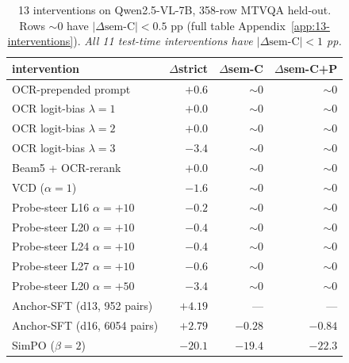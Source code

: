 \begin{table}[t]
\centering
\small
\setlength{\tabcolsep}{4pt}
\begin{tabular}{@{}p{3.5cm}rrr@{}}
\toprule
intervention & $\Delta$strict & $\Delta$sem-C & $\Delta$sem-C+P \\
\midrule
OCR-prepended prompt          & $+0.6$ & $\sim 0$ & $\sim 0$ \\
OCR logit-bias $\lambda{=}1$  & $+0.0$ & $\sim 0$ & $\sim 0$ \\
OCR logit-bias $\lambda{=}2$  & $+0.0$ & $\sim 0$ & $\sim 0$ \\
OCR logit-bias $\lambda{=}3$  & $-3.4$ & $\sim 0$ & $\sim 0$ \\
Beam5 + OCR-rerank            & $+0.0$ & $\sim 0$ & $\sim 0$ \\
VCD ($\alpha{=}1$)            & $-1.6$ & $\sim 0$ & $\sim 0$ \\
Probe-steer L16 $\alpha{=}{+}10$ & $-0.2$ & $\sim 0$ & $\sim 0$ \\
Probe-steer L20 $\alpha{=}{+}10$ & $-0.4$ & $\sim 0$ & $\sim 0$ \\
Probe-steer L24 $\alpha{=}{+}10$ & $-0.4$ & $\sim 0$ & $\sim 0$ \\
Probe-steer L27 $\alpha{=}{+}10$ & $-0.6$ & $\sim 0$ & $\sim 0$ \\
Probe-steer L20 $\alpha{=}{+}50$ & $-3.4$ & $\sim 0$ & $\sim 0$ \\
\midrule
Anchor-SFT (d13, 952 pairs)   & $\bm{+4.19}$ & --- & --- \\
Anchor-SFT (d16, 6054 pairs)  & $+2.79$ & $-0.28$ & $-0.84$ \\
SimPO ($\beta{=}2$)           & $-20.1$ & $-19.4$ & $-22.3$ \\
\bottomrule
\end{tabular}
\caption{13 interventions on Qwen2.5-VL-7B, 358-row MTVQA held-out. Rows $\sim 0$ have $|\Delta\text{sem-C}| < 0.5$ pp (full table Appendix~\ref{app:13-interventions}). \emph{All 11 test-time interventions have $|\Delta\text{sem-C}| < 1$ pp.}}
\label{tab:13-interventions}
\end{table}

